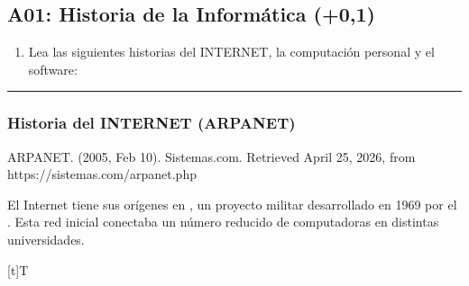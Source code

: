\documentclass[letterpaper,10pt,spanish]{sphinxmanual}
\let\sphinxpxdimen\pdfpxdimen\else\newdimen\sphinxpxdimen
\begin{document}
\subsection{A01: Historia de la Informática (+0,1)}
\label{\detokenize{1_guias/10informatica/G1001:a01-historia-de-la-informatica-0-1}}
\sphinxAtStartPar
{}
\begin{enumerate}
%
\item {} 
\sphinxAtStartPar
Lea las siguientes historias del INTERNET, la computación personal y el software:

\end{enumerate}


\bigskip\hrule\bigskip



\subsubsection{Historia del INTERNET (ARPANET)}
\label{\detokenize{1_guias/10informatica/G1001:historia-del-internet-arpanet}}
\sphinxAtStartPar
%
\begin{footnote}[1]\sphinxAtStartFootnote
ARPANET. (2005, Feb 10). Sistemas.com. Retrieved April 25, 2026, from https://sistemas.com/arpanet.php
%
\end{footnote} El Internet tiene sus orígenes en , un proyecto militar desarrollado en 1969 por el . Esta red inicial conectaba un número reducido de computadoras en distintas universidades.


\begin{savenotes}\sphinxattablestart
\sphinxthistablewithglobalstyle
\centering
\begin{tabulary}{\linewidth}[t]{T}
\sphinxtoprule
\sphinxtableatstartofbodyhook

\begin{sphinxfigure-in-table}
\centering
\capstart
\noindent\sphinxincludegraphics[width=500\sphinxpxdimen]{{image012}.png}
\label{\detokenize{1_guias/10informatica/G1001:id26}}\end{sphinxfigure-in-table}\relax
\\
\sphinxbottomrule
\end{tabulary}
\sphinxtableafterendhook\par
\sphinxattableend\end{savenotes}
\end{document}
